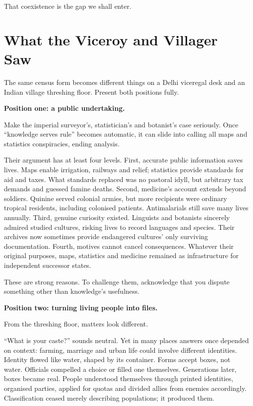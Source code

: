 That coexistence is the gap we shall enter.

\section{What the Viceroy and Villager Saw}
The same census form becomes different things on a Delhi viceregal desk and an Indian village threshing floor. Present both positions fully.

\textbf{Position one: a public undertaking.}

Make the imperial surveyor's, statistician's and botanist's case seriously. Once ``knowledge serves rule'' becomes automatic, it can slide into calling all maps and statistics conspiracies, ending analysis.

Their argument has at least four levels. First, accurate public information saves lives. Maps enable irrigation, railways and relief; statistics provide standards for aid and taxes. What standards replaced was no pastoral idyll, but arbitrary tax demands and guessed famine deaths. Second, medicine's account extends beyond soldiers. Quinine served colonial armies, but more recipients were ordinary tropical residents, including colonised patients. Antimalarials still save many lives annually. Third, genuine curiosity existed. Linguists and botanists sincerely admired studied cultures, risking lives to record languages and species. Their archives now sometimes provide endangered cultures' only surviving documentation. Fourth, motives cannot cancel consequences. Whatever their original purposes, maps, statistics and medicine remained as infrastructure for independent successor states.

These are strong reasons. To challenge them, acknowledge that you dispute something other than knowledge's usefulness.

\textbf{Position two: turning living people into files.}

From the threshing floor, matters look different.

``What is your caste?'' sounds neutral. Yet in many places answers once depended on context: farming, marriage and urban life could involve different identities. Identity flowed like water, shaped by its container. Forms accept boxes, not water. Officials compelled a choice or filled one themselves. Generations later, boxes became real. People understood themselves through printed identities, organised parties, applied for quotas and divided allies from enemies accordingly. Classification ceased merely describing populations; it produced them.

